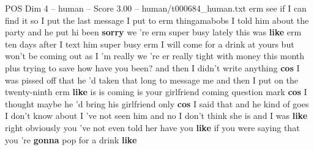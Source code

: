 \begin{textsample}{POS Dim 4 – human – Score 3.00 – human/t000684\_human.txt}  \label{ex:f4_pos_020}
erm see if I can find it so I put the last message I put to erm thingamabobs I told him about the party and he put hi been \textbf{sorry} we 're erm super busy lately this was \textbf{like} erm ten days after I text him super busy erm I will come for a drink at yours but won't be coming out as I 'm really we 're er really tight with money this month plus trying to save how have you been? and then I didn't write anything \textbf{cos} I was pissed off that he 'd taken that long to message me and then I put on the twenty-ninth erm \textbf{like} is is coming is your girlfriend coming question mark \textbf{cos} I thought maybe he 'd bring his girlfriend only \textbf{cos} I said that and he kind of goes I don't know about I 've not seen him and no I don't think she is and I was \textbf{like} right obviously you 've not even told her have you \textbf{like} if you were saying that you 're \textbf{gonna} pop for a drink \textbf{like}

\end{textsample}
